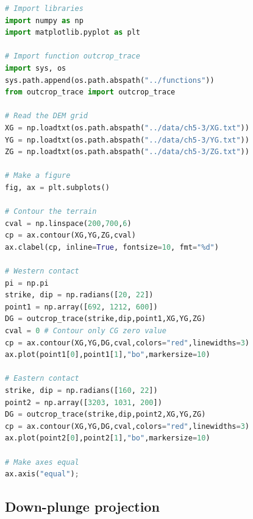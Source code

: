 \documentclass[a4paper , 12pt]{book}
\begin{document}
\begin{center}
\begin{lstlisting}[language=Python, frame=single]
# Import libraries
import numpy as np
import matplotlib.pyplot as plt

# Import function outcrop_trace
import sys, os
sys.path.append(os.path.abspath("../functions"))
from outcrop_trace import outcrop_trace

# Read the DEM grid
XG = np.loadtxt(os.path.abspath("../data/ch5-3/XG.txt"))
YG = np.loadtxt(os.path.abspath("../data/ch5-3/YG.txt"))
ZG = np.loadtxt(os.path.abspath("../data/ch5-3/ZG.txt"))

# Make a figure
fig, ax = plt.subplots()

# Contour the terrain
cval = np.linspace(200,700,6)
cp = ax.contour(XG,YG,ZG,cval)
ax.clabel(cp, inline=True, fontsize=10, fmt="%d")

# Western contact
pi = np.pi
strike, dip = np.radians([20, 22]) 
point1 = np.array([692, 1212, 600])
DG = outcrop_trace(strike,dip,point1,XG,YG,ZG)
cval = 0 # Contour only CG zero value
cp = ax.contour(XG,YG,DG,cval,colors="red",linewidths=3)
ax.plot(point1[0],point1[1],"bo",markersize=10)

# Eastern contact
strike, dip = np.radians([160, 22]) 
point2 = np.array([3203, 1031, 200])
DG = outcrop_trace(strike,dip,point2,XG,YG,ZG)
cp = ax.contour(XG,YG,DG,cval,colors="red",linewidths=3)
ax.plot(point2[0],point2[1],"bo",markersize=10)

# Make axes equal
ax.axis("equal");
\end{lstlisting}
\end{center}

\subsection{Down-plunge projection}
\end{document}

